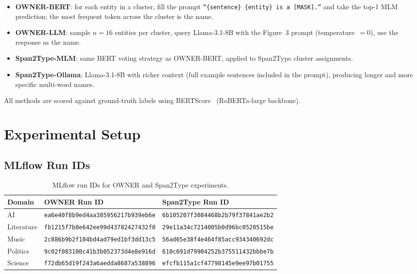 \documentclass[11pt,a4paper]{article}
\begin{document}
\begin{itemize}[leftmargin=1.5em]
  \item \textbf{OWNER-BERT}: for each entity in a cluster, fill the prompt
    \texttt{``\{sentence\} \{entity\} is a [MASK].''} and take the
    top-1 MLM prediction; the most frequent token across the cluster is the name.
  \item \textbf{OWNER-LLM}: sample $n{=}16$ entities per cluster, query
    Llama-3.1-8B with the Figure~3 prompt (temperature~$=0$), use the
    response as the name.
  \item \textbf{Span2Type-MLM}: same BERT voting strategy as OWNER-BERT,
    applied to Span2Type cluster assignments.
  \item \textbf{Span2Type-Ollama}: Llama-3.1-8B with richer context
    (full example sentences included in the prompt), producing longer and
    more specific multi-word names.
\end{itemize}

\noindent
All methods are scored against ground-truth labels using
BERTScore~\cite{zhang2020bertscore} (RoBERTa-large backbone).

\section{Experimental Setup}

\subsection{MLflow Run IDs}

\begin{table}[h]
\centering
\caption{MLflow run IDs for OWNER and Span2Type experiments.}
\label{tab:runs}
\setlength{\tabcolsep}{5pt}
\small
\begin{tabular}{l l l}
\toprule
\textbf{Domain} & \textbf{OWNER Run ID} & \textbf{Span2Type Run ID} \\
\midrule
AI         & \texttt{ea6e40f8b9ed4aa385956217b939eb6e} & \texttt{6b105207f3084468b2b79f37841ae2b2} \\
Literature & \texttt{fb1215f7b8e642ee99d43782427432f0} & \texttt{29e11a34c7214005b0d96bc0520515be} \\
Music      & \texttt{2c886b9b2f104bd4ad79ed1bf3dd13c5} & \texttt{56ad65e38f4e464f85acc934340692dc} \\
Politics   & \texttt{9c02f083100c41b3b052373d4e8e916d} & \texttt{610c691d79904252b375511432bbbe7b} \\
Science    & \texttt{f72db65d19f243a6aedda8687a538896} & \texttt{efcfb115a1cf47798145e9ee97b01755} \\
\bottomrule
\end{tabular}
\end{table}
\end{document}
